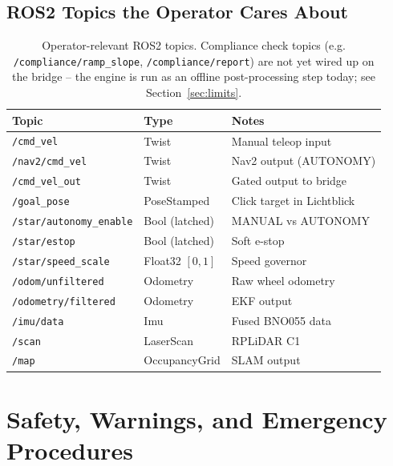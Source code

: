 \documentclass[11pt,letterpaper]{article}
\begin{document}
\subsection{ROS2 Topics the Operator Cares About}
\begin{table}[H]
\centering
\caption{Operator-relevant ROS2 topics. Compliance check topics
(e.g. \texttt{/compliance/ramp\_slope}, \texttt{/compliance/report})
are not yet wired up on the bridge -- the engine is run as an
offline post-processing step today; see Section~\ref{sec:limits}.}
\label{tab:topics}
\small
\begin{tabularx}{\linewidth}{l l X}
\toprule
\textbf{Topic} & \textbf{Type} & \textbf{Notes} \\
\midrule
\texttt{/cmd\_vel}              & Twist    & Manual teleop input \\
\texttt{/nav2/cmd\_vel}         & Twist    & Nav2 output (AUTONOMY) \\
\texttt{/cmd\_vel\_out}         & Twist    & Gated output to bridge \\
\texttt{/goal\_pose}            & PoseStamped & Click target in Lichtblick \\
\texttt{/star/autonomy\_enable} & Bool (latched) & MANUAL vs AUTONOMY \\
\texttt{/star/estop}            & Bool (latched) & Soft e-stop \\
\texttt{/star/speed\_scale}     & Float32 $[0,1]$ & Speed governor \\
\texttt{/odom/unfiltered}       & Odometry & Raw wheel odometry \\
\texttt{/odometry/filtered}     & Odometry & EKF output \\
\texttt{/imu/data}              & Imu      & Fused BNO055 data \\
\texttt{/scan}                  & LaserScan & RPLiDAR C1 \\
\texttt{/map}                   & OccupancyGrid & SLAM output \\
\bottomrule
\end{tabularx}
\end{table}

\section{Safety, Warnings, and Emergency Procedures}
\label{sec:safety}
\end{document}
